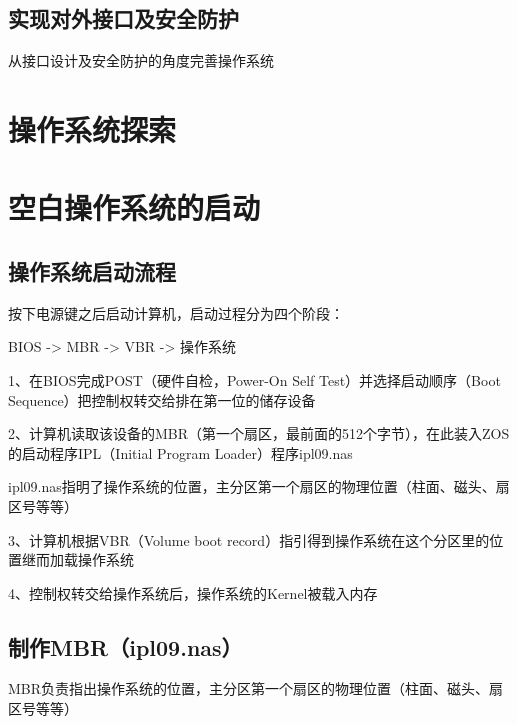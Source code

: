 \documentclass{swfcthesis}
\begin{document}
	\section{实现对外接口及安全防护}
	从接口设计及安全防护的角度完善操作系统
	
\chapter{操作系统探索}

\chapter{空白操作系统的启动}

	\section{操作系统启动流程}
	按下电源键之后启动计算机，启动过程分为四个阶段\cite{hbt}：
		\begin{center}BIOS -> MBR -> VBR -> 操作系统\end{center}
		
		1、在BIOS完成POST（硬件自检，Power-On Self Test）并选择启动顺序（Boot Sequence）把控制权转交给排在第一位的储存设备
		
		2、计算机读取该设备的MBR（第一个扇区，最前面的512个字节），在此装入ZOS的启动程序IPL（Initial Program Loader）程序ipl09.nas
		
		\hspace*{1cm}ipl09.nas指明了操作系统的位置，主分区第一个扇区的物理位置（柱面、磁头、扇区号等等）

		3、计算机根据VBR（Volume boot record）指引得到操作系统在这个分区里的位置继而加载操作系统
		
		4、控制权转交给操作系统后，操作系统的Kernel被载入内存
		
	\section{制作MBR（ipl09.nas）}
		MBR负责指出操作系统的位置，主分区第一个扇区的物理位置（柱面、磁头、扇区号等等）
		\inputminted[tabsize=2, firstline=6, lastline=6,
		linenos=true]{nasm}{../ZOS/src/kernel/ipl09.nas}
		
		\inputminted[tabsize=2, firstline=12, lastline=29,
		linenos=true]{nasm}{../ZOS/src/kernel/ipl09.nas}
		
		\inputminted[tabsize=2, firstline=43, lastline=45,
		linenos=true]{nasm}{../ZOS/src/kernel/ipl09.nas}
		
\end{document}
